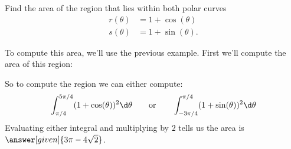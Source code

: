 \documentclass{ximera}
\begin{document}
\begin{example}
  Find the area of the region that lies within both polar curves
  \begin{align*}
    r(\theta) &= 1+ \cos(\theta)\\
    s(\theta) &= 1+ \sin(\theta).
  \end{align*}
  \begin{explanation}
    To compute this area, we'll use the previous example. First we'll compute the area of this region:
    \begin{image}
    \end{image}
    So to compute the region we can either compute:
    \[
    \int_{\pi/4}^{5\pi/4} (1+\cos(\theta))^2 \d \theta \qquad\text{or}\qquad\int_{-3\pi/4}^{\pi/4} (1+\sin(\theta))^2 \d \theta
    \]
    Evaluating either integral and multiplying by $2$ tells us the
    area is $\answer[given]{3\pi-4\sqrt{2}}$.
  \end{explanation}
\end{example}
\end{document}
